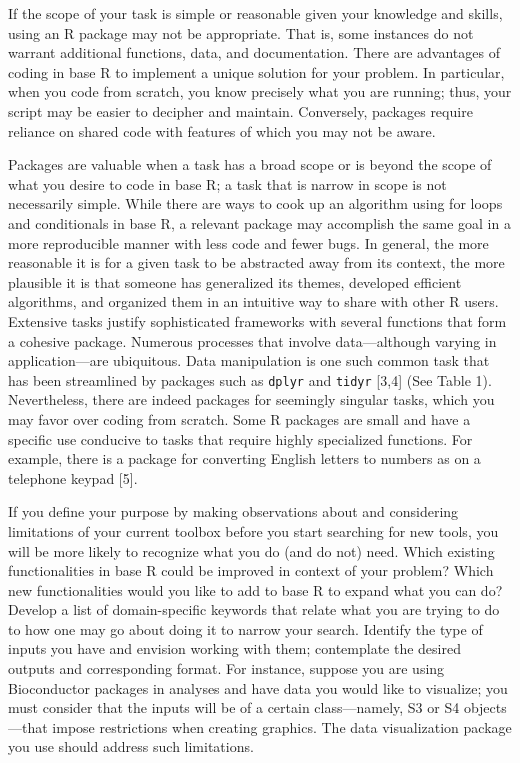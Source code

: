 \documentclass[10pt,letterpaper]{article}
\begin{document}
If the scope of your task is simple or reasonable given your knowledge
and skills, using an R package may not be appropriate. That is, some
instances do not warrant additional functions, data, and documentation.
There are advantages of coding in base R to implement a unique solution
for your problem. In particular, when you code from scratch, you know
precisely what you are running; thus, your script may be easier to
decipher and maintain. Conversely, packages require reliance on shared
code with features of which you may not be aware.

Packages are valuable when a task has a broad scope or is beyond the
scope of what you desire to code in base R; a task that is narrow in
scope is not necessarily simple. While there are ways to cook up an
algorithm using for loops and conditionals in base R, a relevant package
may accomplish the same goal in a more reproducible manner with less
code and fewer bugs. In general, the more reasonable it is for a given
task to be abstracted away from its context, the more plausible it is
that someone has generalized its themes, developed efficient algorithms,
and organized them in an intuitive way to share with other R users.
Extensive tasks justify sophisticated frameworks with several functions
that form a cohesive package. Numerous processes that involve
data---although varying in application---are ubiquitous. Data
manipulation is one such common task that has been streamlined by
packages such as \texttt{dplyr} and \texttt{tidyr} {[}3,4{]} (See Table
1). Nevertheless, there are indeed packages for seemingly singular
tasks, which you may favor over coding from scratch. Some R packages are
small and have a specific use conducive to tasks that require highly
specialized functions. For example, there is a package for converting
English letters to numbers as on a telephone keypad {[}5{]}.

If you define your purpose by making observations about and considering
limitations of your current toolbox before you start searching for new
tools, you will be more likely to recognize what you do (and do not)
need. Which existing functionalities in base R could be improved in
context of your problem? Which new functionalities would you like to add
to base R to expand what you can do? Develop a list of domain-specific
keywords that relate what you are trying to do to how one may go about
doing it to narrow your search. Identify the type of inputs you have and
envision working with them; contemplate the desired outputs and
corresponding format. For instance, suppose you are using Bioconductor
packages in analyses and have data you would like to visualize; you must
consider that the inputs will be of a certain class---namely, S3 or S4
objects---that impose restrictions when creating graphics. The data
visualization package you use should address such limitations.
\end{document}
